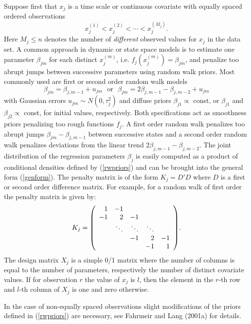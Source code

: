 Suppose first that $x_j$ is a time scale or continuous covariate
with equally spaced ordered observations
$$
x_j^{(1)} < x_j^{(2)} < \cdots < x_j^{(M_j)}.
$$
Here $M_j \leq n$ denotes the number of {\em different} observed
values for $x_j$ in the data set. A common approach in dynamic or
state space models is to estimate one parameter $\beta_{jm}$ for
each distinct $x_j^{(m)}$, i.e. $f_j(x_j^{(m)}) = \beta_{jm}$, and
penalize too abrupt jumps between successive parameters using
random walk priors. Most commonly used are first or second order
random walk models
\begin{equation}
\label{rwpriors}
\beta_{jm}=\beta_{j,m-1}+u_{jm}\,\,\,\,\mbox{or}\,\,\,\,\beta_{jm}=2\beta_{j,m-1}-\beta_{j,m-2}+u_{jm}
\end{equation}
with Gaussian errors $u_{jm}\sim N(0,\tau_j^{2})$ and diffuse
priors $\beta_{j1}\propto$ const, or $\beta_{j1}$ and
$\beta_{j2}\propto$ const, for initial values, respectively. Both
specifications act as smoothness priors penalizing too rough
functions $f_j$. A first order random walk penalizes too abrupt
jumps $\beta_{jm}-\beta_{j,m-1}$ between successive states and a
second order random walk penalizes deviations from the linear
trend $2 \beta_{j,m-1}-\beta_{j,m-2}$. The joint distribution of
the regression parameters $\beta_j$ is easily computed as a
product of conditional densities defined by (\ref{rwpriors}) and
can be brought into the general form (\ref{genform}). The penalty
matrix is of the form $K_j=D'D$ where $D$ is a first or second
order difference matrix. For example, for a random walk of first
order the penalty matrix is given by:
$$
K_j = {\footnotesize \left(
\begin{array}{rrrrr}
 1 & -1 & & &  \\
-1 & 2 & -1 & & \\
 &  \ddots & \ddots & \ddots &  \\
 & & -1 & 2 & -1 \\
  & & & -1 & 1
\end{array}
\right) }.
$$
The design matrix $X_j$ is a simple 0/1 matrix where the number of
columns is equal to the number of parameters, respectively the
number of distinct covariate values. If for observation $r$ the
value of $x_j$ is $l$, then the element in the $r$-th row and
$l$-th column of $X_j$ is one and zero otherwise.

In the case of non-equally spaced observations slight
modifications of the priors defined in (\ref{rwpriors}) are
necessary, see Fahrmeir and Lang (2001a) for details.

